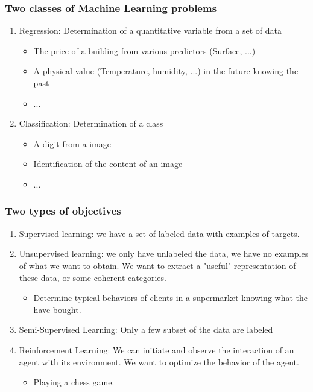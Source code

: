 \documentclass[handout]{beamer}
\begin{document}
\begin{frame}
\frametitle{Two classes of Machine Learning problems}
\begin{enumerate}
\item \alert{Regression}: Determination of a quantitative variable from a set of data
\begin{itemize}
\item The price of a building from various predictors (Surface, ...)
\item A physical value (Temperature, humidity, ...) in the future knowing the past
\item ...
\end{itemize}
\pause
\item \alert{Classification}: Determination of a class 
\begin{itemize}
\item A digit from a image
\item Identification of the content of an image
\item ...
\end{itemize}
\end{enumerate}
\end{frame}
\begin{frame}
\frametitle{Two types of objectives}

\begin{enumerate}[<+->]
\item \alert{Supervised learning}: we have a set of labeled data with examples of targets.
\item \alert{Unsupervised learning}: we only have unlabeled the data, we have no examples of
what we want to obtain. We want to extract a "useful" representation of these data, or
some coherent categories.
\begin{itemize}
\item Determine typical behaviors of clients in a supermarket knowing what the have bought.
\end{itemize}
\item \alert{Semi-Supervised Learning}: Only a few subset of the data are labeled
\item \alert{Reinforcement Learning}: We can initiate and observe the interaction of an agent with its environment. We want to optimize the behavior of the agent.
\begin{itemize}
\item Playing a chess game.
\end{itemize}
\end{enumerate}
\end{frame}
\end{document}
